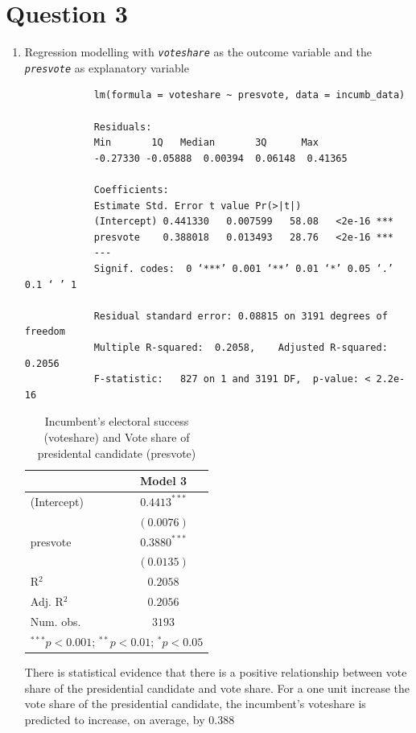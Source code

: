 \documentclass[12pt,letterpaper]{article}
\begin{document}
	\section*{Question 3}
	\begin{enumerate}
		\item Regression modelling with \textit{\texttt{voteshare}} as the outcome variable and the \textit{\texttt{presvote}} as explanatory variable
		
		\begin{verbatim}
			lm(formula = voteshare ~ presvote, data = incumb_data)
			
			Residuals:
			Min       1Q   Median       3Q      Max 
			-0.27330 -0.05888  0.00394  0.06148  0.41365 
			
			Coefficients:
			Estimate Std. Error t value Pr(>|t|)    
			(Intercept) 0.441330   0.007599   58.08   <2e-16 ***
			presvote    0.388018   0.013493   28.76   <2e-16 ***
			---
			Signif. codes:  0 ‘***’ 0.001 ‘**’ 0.01 ‘*’ 0.05 ‘.’ 0.1 ‘ ’ 1
			
			Residual standard error: 0.08815 on 3191 degrees of freedom
			Multiple R-squared:  0.2058,	Adjusted R-squared:  0.2056 
			F-statistic:   827 on 1 and 3191 DF,  p-value: < 2.2e-16
		\end{verbatim}
		\begin{table}[H]
			\begin{center}
				\begin{tabular}{l c}
					\hline
					& Model 3 \\
					\hline
					(Intercept) & $0.4413^{***}$ \\
					& $(0.0076)$     \\
					presvote    & $0.3880^{***}$ \\
					& $(0.0135)$     \\
					\hline
					R$^2$       & $0.2058$       \\
					Adj. R$^2$  & $0.2056$       \\
					Num. obs.   & $3193$         \\
					\hline
					\multicolumn{2}{l}{\scriptsize{$^{***}p<0.001$; $^{**}p<0.01$; $^{*}p<0.05$}}
				\end{tabular}
				\caption{Incumbent's electoral success (voteshare) and Vote share of presidental candidate (presvote)}
				\label{table:coefficients}
			\end{center}
		\end{table}
	There is statistical evidence that there is a positive relationship between vote share of the presidential candidate and vote share. For a one unit increase the vote share of the presidential candidate, the incumbent's voteshare is predicted to increase, on average, by 0.388%
		

\end{enumerate}
\end{document}

